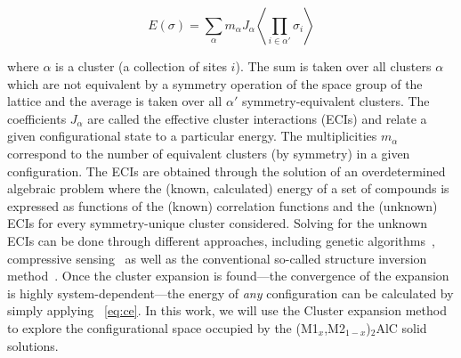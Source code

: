 \documentclass[preprint,amsmath,amssymb,aps, prb,showkeys]{revtex4-1}
\begin{document}
\begin{equation}
E\left( \sigma  \right) = \sum\limits_\alpha  {{m_\alpha }{J_\alpha }\left\langle {\mathop \prod \limits_{i \in \alpha '} {\sigma _i}} \right\rangle }
\label{eq:ce}
\end{equation}

\noindent where $\alpha$ is a cluster (a collection of sites $i$). The sum is taken over all clusters $\alpha$ which are not equivalent by a symmetry operation of the space group of the lattice and the average is taken over all $\alpha '$ symmetry-equivalent clusters. The coefficients $J_{\alpha}$ are called the effective cluster interactions (ECIs) and relate a given configurational state to a particular energy. The multiplicities $m_{\alpha}$ correspond to the number of equivalent clusters (by symmetry) in a given configuration. The ECIs are obtained through the solution of an overdetermined algebraic problem where the (known, calculated) energy of a set of compounds is expressed as functions of the (known) correlation functions and the (unknown) ECIs for every symmetry-unique cluster considered. Solving for the unknown ECIs can be done through different approaches, including genetic algorithms~\cite{blum2005using}, compressive sensing~\cite{nelson2013compressive} as well as the conventional so-called structure 
inversion method~\cite{vanderwalleATAT,connolly1983density}. Once the cluster expansion is found---the convergence of the expansion is highly system-dependent---the energy of \emph{any} configuration can be calculated by simply applying ~\ref{eq:ce}. In this work, we will use the Cluster expansion method to explore the configurational space occupied by the (M1$_x$,M2$_{1-x}$)$_2$AlC solid solutions.
\end{document}
